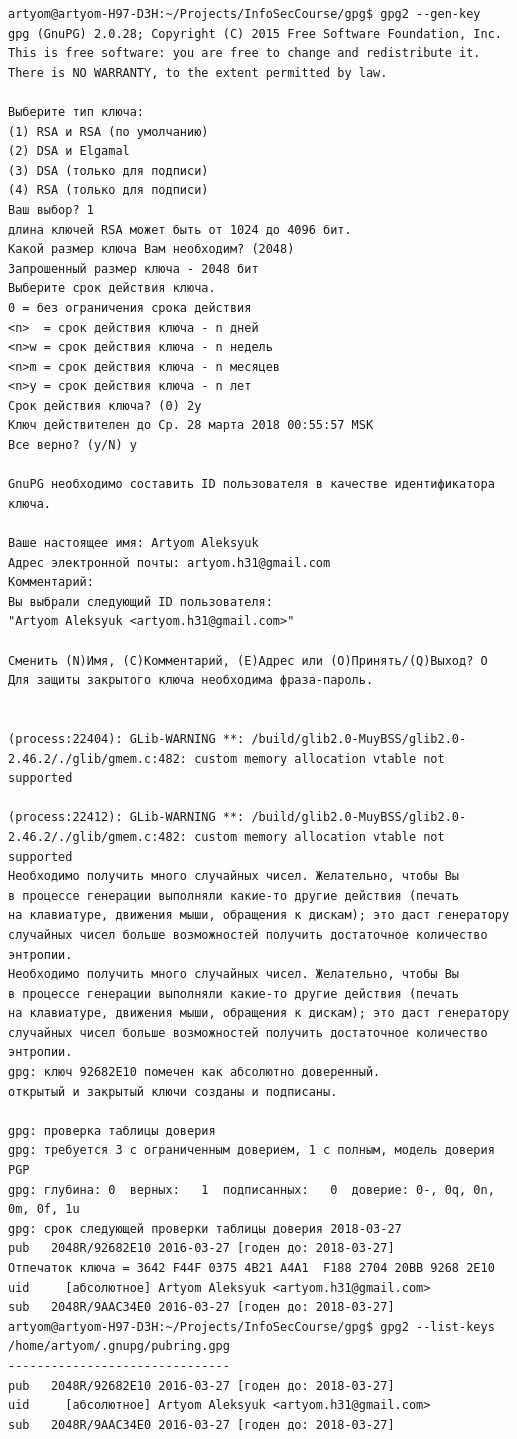 \begin{lstlisting}
artyom@artyom-H97-D3H:~/Projects/InfoSecCourse/gpg$ gpg2 --gen-key
gpg (GnuPG) 2.0.28; Copyright (C) 2015 Free Software Foundation, Inc.
This is free software: you are free to change and redistribute it.
There is NO WARRANTY, to the extent permitted by law.

Выберите тип ключа:
(1) RSA и RSA (по умолчанию)
(2) DSA и Elgamal
(3) DSA (только для подписи)
(4) RSA (только для подписи)
Ваш выбор? 1
длина ключей RSA может быть от 1024 до 4096 бит.
Какой размер ключа Вам необходим? (2048) 
Запрошенный размер ключа - 2048 бит
Выберите срок действия ключа.
0 = без ограничения срока действия
<n>  = срок действия ключа - n дней
<n>w = срок действия ключа - n недель
<n>m = срок действия ключа - n месяцев
<n>y = срок действия ключа - n лет
Срок действия ключа? (0) 2y
Ключ действителен до Ср. 28 марта 2018 00:55:57 MSK
Все верно? (y/N) y

GnuPG необходимо составить ID пользователя в качестве идентификатора ключа.

Ваше настоящее имя: Artyom Aleksyuk
Адрес электронной почты: artyom.h31@gmail.com
Комментарий: 
Вы выбрали следующий ID пользователя:
"Artyom Aleksyuk <artyom.h31@gmail.com>"

Сменить (N)Имя, (C)Комментарий, (E)Адрес или (O)Принять/(Q)Выход? O
Для защиты закрытого ключа необходима фраза-пароль.


(process:22404): GLib-WARNING **: /build/glib2.0-MuyBSS/glib2.0-2.46.2/./glib/gmem.c:482: custom memory allocation vtable not supported

(process:22412): GLib-WARNING **: /build/glib2.0-MuyBSS/glib2.0-2.46.2/./glib/gmem.c:482: custom memory allocation vtable not supported
Необходимо получить много случайных чисел. Желательно, чтобы Вы
в процессе генерации выполняли какие-то другие действия (печать
на клавиатуре, движения мыши, обращения к дискам); это даст генератору
случайных чисел больше возможностей получить достаточное количество энтропии.
Необходимо получить много случайных чисел. Желательно, чтобы Вы
в процессе генерации выполняли какие-то другие действия (печать
на клавиатуре, движения мыши, обращения к дискам); это даст генератору
случайных чисел больше возможностей получить достаточное количество энтропии.
gpg: ключ 92682E10 помечен как абсолютно доверенный.
открытый и закрытый ключи созданы и подписаны.

gpg: проверка таблицы доверия
gpg: требуется 3 с ограниченным доверием, 1 с полным, модель доверия PGP
gpg: глубина: 0  верных:   1  подписанных:   0  доверие: 0-, 0q, 0n, 0m, 0f, 1u
gpg: срок следующей проверки таблицы доверия 2018-03-27
pub   2048R/92682E10 2016-03-27 [годен до: 2018-03-27]
Отпечаток ключа = 3642 F44F 0375 4B21 A4A1  F188 2704 20BB 9268 2E10
uid     [абсолютное] Artyom Aleksyuk <artyom.h31@gmail.com>
sub   2048R/9AAC34E0 2016-03-27 [годен до: 2018-03-27]
artyom@artyom-H97-D3H:~/Projects/InfoSecCourse/gpg$ gpg2 --list-keys
/home/artyom/.gnupg/pubring.gpg
-------------------------------
pub   2048R/92682E10 2016-03-27 [годен до: 2018-03-27]
uid     [абсолютное] Artyom Aleksyuk <artyom.h31@gmail.com>
sub   2048R/9AAC34E0 2016-03-27 [годен до: 2018-03-27]
\end{lstlisting}

